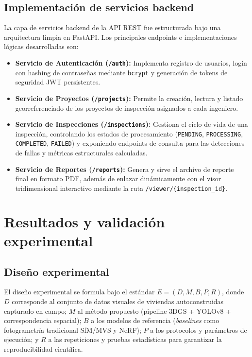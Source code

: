\documentclass[12pt,oneside]{report}
\begin{document}
\section{Implementación de servicios backend}
La capa de servicios backend de la API REST fue estructurada bajo una arquitectura limpia en FastAPI. Los principales endpoints e implementaciones lógicas desarrolladas son:
\begin{itemize}
    \item \textbf{Servicio de Autenticación (\texttt{/auth}):} Implementa registro de usuarios, login con hashing de contraseñas mediante \texttt{bcrypt} y generación de tokens de seguridad JWT persistentes.
    \item \textbf{Servicio de Proyectos (\texttt{/projects}):} Permite la creación, lectura y listado georreferenciado de los proyectos de inspección asignados a cada ingeniero.
    \item \textbf{Servicio de Inspecciones (\texttt{/inspections}):} Gestiona el ciclo de vida de una inspección, controlando los estados de procesamiento (\texttt{PENDING}, \texttt{PROCESSING}, \texttt{COMPLETED}, \texttt{FAILED}) y exponiendo endpoints de consulta para las detecciones de fallas y métricas estructurales calculadas.
    \item \textbf{Servicio de Reportes (\texttt{/reports}):} Genera y sirve el archivo de reporte final en formato PDF, además de enlazar dinámicamente con el visor tridimensional interactivo mediante la ruta \texttt{/viewer/\{inspection\_id\}}.
\end{itemize}

\chapter{Resultados y validación experimental}

\section{Diseño experimental}
El diseño experimental se formula bajo el estándar $E = (D, M, B, P, R)$, donde $D$ corresponde al conjunto de datos visuales de viviendas autoconstruidas capturado en campo; $M$ al método propuesto (pipeline 3DGS + YOLOv8 + correspondencia espacial); $B$ a los modelos de referencia (\textit{baselines} como fotogrametría tradicional SfM/MVS y NeRF); $P$ a los protocolos y parámetros de ejecución; y $R$ a las repeticiones y pruebas estadísticas para garantizar la reproducibilidad científica.\par
\end{document}
